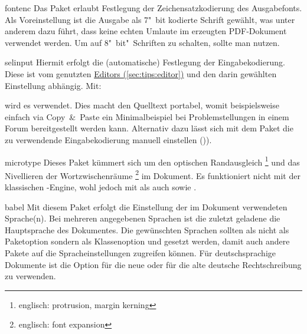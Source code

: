 \begin{packages}
\item[fontenc]
  Das Paket erlaubt Festlegung der Zeichensatzkodierung des Ausgabefonts. Als 
  Voreinstellung ist die Ausgabe als 7"~bit kodierte Schrift gewählt, was unter 
  anderem dazu führt, dass keine echten Umlaute im erzeugten PDF-Dokument 
  verwendet werden. Um auf 8"~bit"~Schriften zu schalten, sollte man
   nutzen.
\item[selinput]
  Hiermit erfolgt die (automatische) Festlegung der Eingabekodierung. Diese ist 
  vom genutzten \hyperref[sec:tips:editor]{Editors (\autoref{sec:tips:editor})} 
  und den darin gewählten Einstellung abhängig. Mit:
  \begin{Code}
  \usepackage{selinput}
  \end{Code}\vspace{-\baselineskip}%
  wird es verwendet. Dies macht den Quelltext portabel, womit beispielsweise 
  einfach via Copy~\&~Paste ein %
  {Minimalbeispiel} bei Problemstellungen in einem Forum bereitgestellt werden 
  kann. Alternativ dazu lässt sich mit dem Paket  die zu 
  verwendende Eingabekodierung manuell einstellen
  ()).
\item[microtype]
  Dieses Paket kümmert sich um den optischen Randausgleich%
  \footnote{englisch: protrusion, margin kerning}
  und das Nivellieren der Wortzwischenräume%
  \footnote{englisch: font expansion}
  im Dokument. Es funktioniert nicht mit der klassischen -Engine, 
  wohl jedoch mit  als auch  sowie .
\item[babel]
  Mit diesem Paket erfolgt die Einstellung der im Dokument verwendeten 
  Sprache(n). Bei mehreren angegebenen Sprachen ist die zuletzt geladene die 
  Hauptsprache des Dokumentes. Die gewünschten Sprachen sollten als nicht als 
  Paketoption sondern als Klassenoption und gesetzt werden, damit auch andere 
  Pakete auf die Spracheinstellungen zugreifen können. Für deutschsprachige 
  Dokumente ist die Option  für die neue oder  
  für die alte deutsche Rechtschreibung zu verwenden. 
  

\end{packages}
